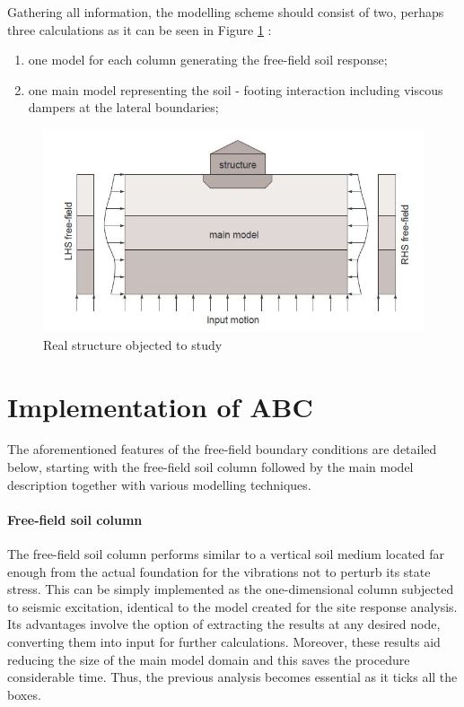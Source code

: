 \documentclass[10pt,a4paper]{report}
\begin{document}
Gathering all information, the modelling scheme should consist of two, perhaps three calculations as it can be seen in Figure \ref{ff} :
\begin{enumerate}
	\item one model for each column generating the free-field soil response;
	\item one main model representing the soil - footing interaction including viscous dampers at the lateral boundaries;
\end{enumerate} 

	\begin{figure}[!h]
		\centering
		\includegraphics[width=0.7\linewidth]{"free-field"}
		\caption{Real structure objected to study}
		\label{ff}
	\end{figure} 
	
\section{Implementation of ABC} \label{implemenent}
The aforementioned features of the free-field boundary conditions are detailed below, starting with the free-field soil column followed by the main model description together with various modelling techniques. 
	\paragraph{Free-field soil column}
	The free-field soil column performs similar to a vertical soil medium located far enough from the actual foundation for the vibrations not to perturb its state stress. This can be simply implemented as the one-dimensional column subjected to seismic excitation, identical to the model created for the site response analysis. Its advantages involve the option of extracting the results at any desired node, converting them into input for further calculations. Moreover, these results aid reducing the size of the main model domain and this saves the procedure considerable time. Thus, the previous analysis becomes essential as it ticks all the boxes. 
	
\end{document}
